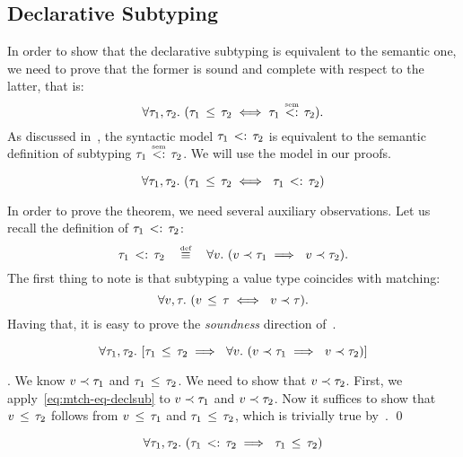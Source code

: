 \subsection{Declarative Subtyping}\label{sec:declsub-correct}

In order to show that the declarative subtyping is equivalent
to the semantic one,
we need to prove that the former is sound and complete with respect
to the latter, that is:
\[
\forall \ty_1, \ty_2.\ (\bjsub{\ty_1}{\ty_2} \iff \bjtruesemsub{\ty_1}{\ty_2}).
\]
As discussed in~, 
the syntactic model $\tau_1 \, <: \, \tau_2$ is equivalent 
to the semantic definition of subtyping $\bjtruesemsub{\ty_1}{\ty_2}$.
We will use the model in our proofs.

\begin{theorem}\label{thm:declsub-correct}
\[
\forall \ty_1, \ty_2.\ (\bjsub{\ty_1}{\ty_2} \iff\ \bjsemsub{\ty_1}{\ty_2})
\]
\end{theorem}

In order to prove the theorem, we need several auxiliary observations.
Let us recall the definition of $\tau_1 \, <: \, \tau_2$:
\[
\bjsemsub{\ty_1}{\ty_2} \quad \defsign \quad
\forall \vty.\ (\bjmtch{\vty}{\ty_1} \implies\ \bjmtch{\vty}{\ty_2}).
\]
The first thing to note is that
subtyping a value type coincides with matching:
\begin{equation}\label{eq:mtch-eq-declsub}
\forall \vty, \ty.\ (\bjsub{\vty}{\ty} \iff\ \bjmtch{\vty}{\ty}).
\end{equation}
Having that, it is easy to prove the \emph{soundness} direction
of~.
\begin{lemma}
\[
\forall \ty_1, \ty_2.\ 
[\bjsub{\ty_1}{\ty_2} \implies\ 
\forall \vty.\ (\bjmtch{\vty}{\ty_1} \implies\ \bjmtch{\vty}{\ty_2})]
\]
\end{lemma}
\noindent
\Proof. We know $v \prec \tau_1$ and $\tau_1 \, \leq \, \tau_2$.
We need to show that $v \prec \tau_2$.
First, we apply~\eqref{eq:mtch-eq-declsub} to $v \prec \tau_1$
and $v \prec \tau_2$. 
Now it suffices to show that $v \, \leq \, \tau_2$ follows from
$v \, \leq \, \tau_1$ and $\tau_1 \, \leq \, \tau_2$, 
which is trivially true by~\RD{Trans}.
\qed

\begin{lemma}\label{lem:declsub-complete}
\[	
\forall \ty_1, \ty_2.\ 
(\bjsemsub{\ty_1}{\ty_2} \implies\ \bjsub{\ty_1}{\ty_2})
\]
\end{lemma}

